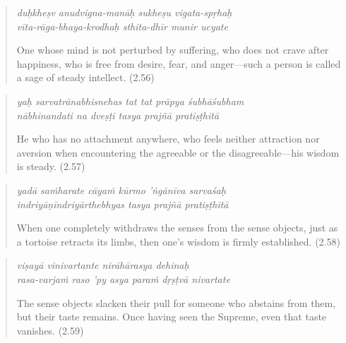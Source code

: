 \documentclass[12pt, twoside, openright]{memoir}
\begin{document}
\par
\begin{verse}
\textit{duḥkheṣv anudvigna-manāḥ sukheṣu vigata-spṛhaḥ} \\
\textit{vīta-rāga-bhaya-krodhaḥ sthita-dhīr munir ucyate}

\noindent One whose mind is not perturbed by suffering, who does not crave after happiness, who is free from desire, fear, and anger---such a person is called a sage of steady intellect. (2.56)
\end{verse}
\par



\par
\begin{verse}
\textit{yaḥ sarvatrānabhisnehas tat tat prāpya śubhāśubham} \\
\textit{nābhinandati na dveṣṭi tasya prajñā pratiṣṭhitā}

\noindent He who has no attachment anywhere, who feels neither attraction nor aversion when encountering the agreeable or the disagreeable---his wisdom is steady. (2.57)
\end{verse}
\par



\par
\begin{verse}
\textit{yadā saṁharate cāyaṁ kūrmo ’ṅgānīva sarvaśaḥ} \\
\textit{indriyāṇīndriyārthebhyas tasya prajñā pratiṣṭhitā}

\noindent When one completely withdraws the senses from the sense objects, just as a tortoise retracts its limbs, then one's wisdom is firmly established. (2.58)
\end{verse}
\par



\par
\begin{verse}
\textit{viṣayā vinivartante nirāhārasya dehinaḥ} \\
\textit{rasa-varjaṁ raso ’py asya paraṁ dṛṣṭvā nivartate}

\noindent The sense objects slacken their pull for someone who abstains from them, but their taste remains. Once having seen the Supreme, even that taste vanishes. (2.59)
\end{verse}
\par
\end{document}
